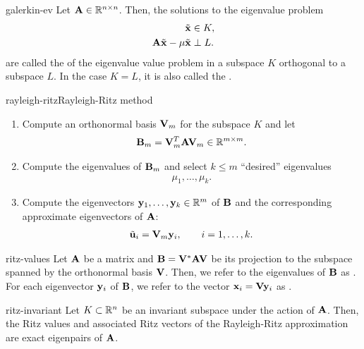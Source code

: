 \begin{Definition}{galerkin-ev}
  Let $\mathbf A\in\mathbb R^{n\times n}$. Then, the solutions to the eigenvalue problem
  \begin{align}
    \tilde{\mathbf x} &\in K,\\
    \mathbf A\tilde{\mathbf x} - \mu\tilde{\mathbf x}&\perp L.
  \end{align}
  are called the  of the eigenvalue value problem in a subspace $K$ orthogonal to a subspace
  $L$. In the case $K=L$, it is also called the .
\end{Definition}

\begin{Algorithm*}{rayleigh-ritz}{Rayleigh-Ritz method}
  \begin{enumerate}
  \item Compute an orthonormal basis $\mathbf V_m$ for the subspace $K$ and let
    \begin{gather}
      \mathbf B_m = \mathbf V_m^T\mathbf A\mathbf V_m \in \mathbb R^{m\times m}.
    \end{gather}
  \item Compute the eigenvalues of $\mathbf B_m$ and select $k\le m$ ``desired'' eigenvalues
    \begin{gather}
      \mu_1, \dots,\mu_k.
    \end{gather}
  \item Compute the eigenvectors $\mathbf y_1,\dots,\mathbf y_k\in\mathbb R^m$ of $\mathbf B$
    and the corresponding approximate eigenvectors of $\mathbf A$:
    \begin{gather}
      \tilde{\mathbf u}_i = \mathbf V_m \mathbf y_i,\qquad i=1,\dots,k.
    \end{gather}
  \end{enumerate}
\end{Algorithm*}

\begin{Definition}{ritz-values}
  Let $\mathbf A$ be a matrix and $\mathbf B = \mathbf V^*\mathbf A\mathbf V$ be its
  projection to the subspace spanned by the orthonormal basis
  $\mathbf V$. Then, we refer to the eigenvalues of $\mathbf B$ as
  .
  For each eigenvector $\mathbf y_i$ of $\mathbf B$, we refer to the vector
  $\mathbf x_i = \mathbf V\mathbf y_i$ as .
\end{Definition}

\begin{Lemma}{ritz-invariant}
  Let $K\subset\mathbb R^n$ be an invariant subspace under the action of
  $\mathbf A$. Then, the Ritz values and associated Ritz vectors of the
  Rayleigh-Ritz approximation are exact eigenpairs of $\mathbf A$.
\end{Lemma}

